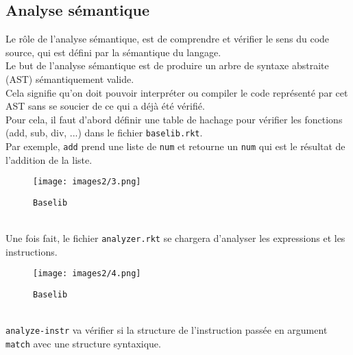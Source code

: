 \documentclass[a4paper,10pt]{article}
\begin{document}
\begin{newpage}
\section{Analyse sémantique}
Le rôle de l'analyse sémantique, est de comprendre et vérifier le sens du code source, qui est défini par la sémantique du langage.\\
Le but de l’analyse sémantique est de produire un arbre de syntaxe abstraite (AST) sémantiquement valide.\\Cela signifie qu’on doit pouvoir interpréter ou compiler le code représenté par cet AST
sans se soucier de ce qui a déjà été vérifié.\\
Pour cela, il faut d'abord définir une table de hachage pour vérifier les fonctions (add, sub, div, ...) dans le fichier {\tt baselib.rkt}.\\Par exemple, {\tt add} prend une liste de {\tt num} et retourne un {\tt num} qui est le résultat de l'addition de la liste.\\

\begin{figure}[h]
\begin{center}
    \texttt{[image: images2/3.png]}
\end{center}
\caption{\label{fig:1}{\tt Baselib}}
\end{figure}~\\

Une fois fait, le fichier {\tt analyzer.rkt} se chargera d'analyser les expressions et les instructions.

\begin{figure}[h]
\begin{center}
    \texttt{[image: images2/4.png]}
\end{center}
\caption{\label{fig:1}{\tt Baselib}}
\end{figure}~\\

{\tt analyze-instr} va vérifier si la structure de l'instruction passée en argument {\tt match} avec une structure syntaxique.

\pagestyle{plain}
\end{newpage}
\end{document}
